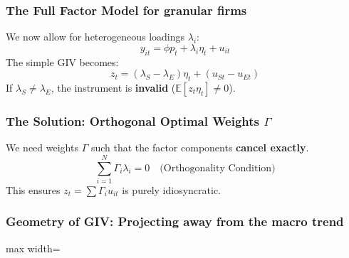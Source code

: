 \documentclass[aspectratio=169,11pt]{beamer}
\begin{document}
\begin{frame}
    \frametitle{The Full Factor Model for granular firms}
    \vspace{0.5cm}
    We now allow for heterogeneous loadings $\lambda_i$:
    \vspace{0.5cm}
    \begin{equation}
        y_{it} = \phi p_t + \lambda_i \eta_t + u_{it} \tag{full}
    \end{equation}
    \vspace{0.5cm}
    The simple GIV becomes:
    \begin{equation*}
        z_t = (\lambda_S - \lambda_E) \eta_t + (u_{St} - u_{Et})
    \end{equation*}
    \vspace{0.5cm}
    {\Large
        If $\lambda_S \neq \lambda_E$, the instrument is \textbf{invalid} ($\mathbb{E}[z_t \eta_t] \neq 0$).
    }
\end{frame}

\begin{frame}
    \frametitle{The Solution: Orthogonal Optimal Weights $\Gamma$}
    \vspace{0.5cm}
    {\Large
        We need weights $\Gamma$ such that the factor components \textbf{cancel exactly}.
    }
    \vspace{1cm}
    \begin{equation*}
        \sum_{i=1}^N \Gamma_i \lambda_i = 0 \quad \text{(Orthogonality Condition)}
    \end{equation*}
    \vspace{0.5cm}
    {\Large
        This ensures $z_t = \sum \Gamma_i u_{it}$ is purely idiosyncratic.
    }
\end{frame}

\begin{frame}
    \frametitle{Geometry of GIV: Projecting away from the macro trend}
    \vspace{0.5cm}
    \begin{center}
        \begin{adjustbox}{max width=\textwidth}
        \end{adjustbox}
    \end{center}
\end{frame}
\end{document}
